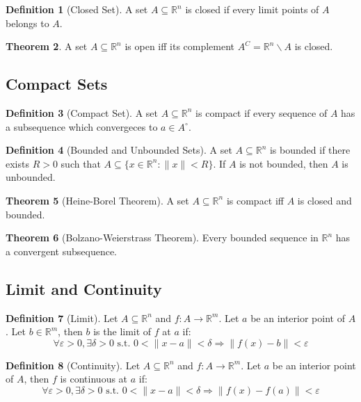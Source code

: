 \documentclass[12pt]{article}
\theoremstyle{definition}
\newtheorem{definition}{Definition}[subsection]
\newtheorem{theorem}[definition]{Theorem}
\theoremstyle{remark}
\begin{document}
\begin{definition}[Closed Set]
A set $A\subseteq\mathbb{R}^n$ is closed if every limit points of $A$ belongs to $A$.
\end{definition}

\begin{theorem}
A set $A\subseteq\mathbb{R}^n$ is open iff its complement $A^C=\mathbb{R}^n\backslash A$ is closed.
\end{theorem}

\subsection{Compact Sets}

\begin{definition}[Compact Set]
A set $A\subseteq\mathbb{R}^n$ is compact if every sequence of $A$ has a subsequence which convergeces to $a\in A^\circ$.
\end{definition}

\begin{definition}[Bounded and Unbounded Sets]
A set $A\subseteq\mathbb{R}^n$ is bounded if there exists $R>0$ such that $A\subseteq\{x\in\mathbb{R}^n: \|x\|<R\}$. If $A$ is not bounded, then $A$ is unbounded.
\end{definition}

\begin{theorem}[Heine-Borel Theorem]
A set $A\subseteq\mathbb{R}^n$ is compact iff $A$ is closed and bounded.
\end{theorem}

\begin{theorem}[Bolzano-Weierstrass Theorem]
Every bounded sequence in $\mathbb{R}^n$ has a convergent subsequence.
\end{theorem}

\subsection{Limit and Continuity}
\begin{definition}[Limit]
Let $A\subseteq\mathbb{R}^n$ and $f:A\to\mathbb{R}^m$. Let $a$ be an interior point of $A$. Let $b\in\mathbb{R}^m$, then $b$ is the limit of $f$ at $a$ if:
\[
\forall \varepsilon>0, \exists \delta>0 \text{ s.t. } 0<\|x-a\|<\delta\Rightarrow\|f(x)-b\|<\varepsilon
\]
\end{definition}

\begin{definition}[Continuity]
Let $A\subseteq\mathbb{R}^n$ and $f:A\to\mathbb{R}^m$. Let $a$ be an interior point of $A$, then $f$ is continuous at $a$ if:
\[
\forall\varepsilon>0, \exists \delta>0 \text{ s.t. } 0<\|x-a\|<\delta\Rightarrow \|f(x)-f(a)\|<\varepsilon
\]
\end{definition}
\end{document}
